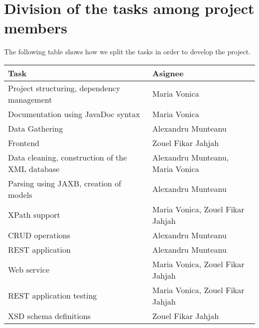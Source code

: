 \section{Division of the tasks among project members}

The following table shows how we split the tasks in order to develop the project.

\begin{center}
  \begin{tabular}{ll}
    Task & Asignee \\
    \hline
    Project structuring, dependency management & Maria Vonica \\
    Documentation using JavaDoc syntax & Maria Vonica \\
    Data Gathering & Alexandru Munteanu \\
    Frontend & Zouel Fikar Jahjah \\
    Data cleaning, construction of the XML database & Alexandru Munteanu, Maria Vonica \\
    Parsing using JAXB, creation of models & Alexandru Munteanu \\
    XPath support & Maria Vonica, Zouel Fikar Jahjah \\
    CRUD operations & Alexandru Munteanu \\
    REST application & Alexandru Munteanu \\
    Web service & Maria Vonica, Zouel Fikar Jahjah \\
    REST application testing & Maria Vonica, Zouel Fikar Jahjah \\
    XSD schema definitions & Zouel Fikar Jahjah \\
    \end{tabular}
  \end{center}
